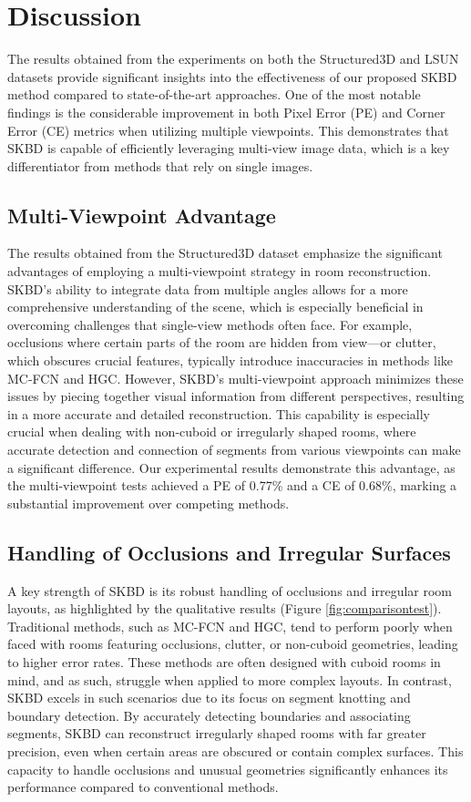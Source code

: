 \section{Discussion}
\label{sec:discussion}

The results obtained from the experiments on both the Structured3D and LSUN datasets provide significant insights into the effectiveness of our proposed SKBD method compared to state-of-the-art approaches. One of the most notable findings is the considerable improvement in both Pixel Error (PE) and Corner Error (CE) metrics when utilizing multiple viewpoints. This demonstrates that SKBD is capable of efficiently leveraging multi-view image data, which is a key differentiator from methods that rely on single images.

\subsection{Multi-Viewpoint Advantage}
The results obtained from the Structured3D dataset emphasize the significant advantages of employing a multi-viewpoint strategy in room reconstruction. SKBD's ability to integrate data from multiple angles allows for a more comprehensive understanding of the scene, which is especially beneficial in overcoming challenges that single-view methods often face. For example, occlusions where certain parts of the room are hidden from view—or clutter, which obscures crucial features, typically introduce inaccuracies in methods like MC-FCN and HGC. However, SKBD’s multi-viewpoint approach minimizes these issues by piecing together visual information from different perspectives, resulting in a more accurate and detailed reconstruction. This capability is especially crucial when dealing with non-cuboid or irregularly shaped rooms, where accurate detection and connection of segments from various viewpoints can make a significant difference. Our experimental results demonstrate this advantage, as the multi-viewpoint tests achieved a PE of 0.77\% and a CE of 0.68\%, marking a substantial improvement over competing methods.

\subsection{Handling of Occlusions and Irregular Surfaces}
A key strength of SKBD is its robust handling of occlusions and irregular room layouts, as highlighted by the qualitative results (Figure \ref{fig:comparisontest}). Traditional methods, such as MC-FCN and HGC, tend to perform poorly when faced with rooms featuring occlusions, clutter, or non-cuboid geometries, leading to higher error rates. These methods are often designed with cuboid rooms in mind, and as such, struggle when applied to more complex layouts. In contrast, SKBD excels in such scenarios due to its focus on segment knotting and boundary detection. By accurately detecting boundaries and associating segments, SKBD can reconstruct irregularly shaped rooms with far greater precision, even when certain areas are obscured or contain complex surfaces. This capacity to handle occlusions and unusual geometries significantly enhances its performance compared to conventional methods.

